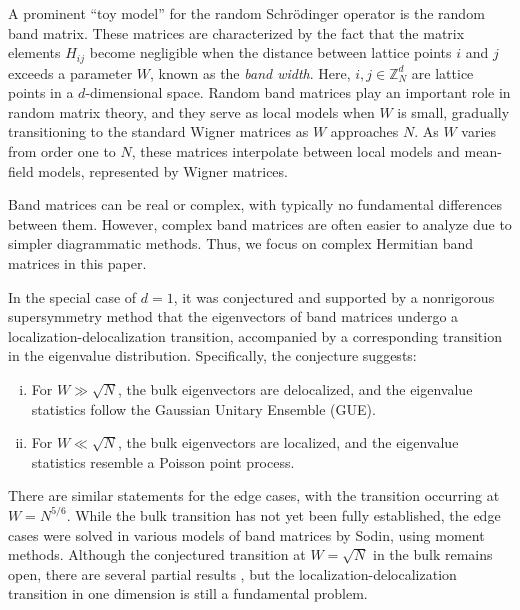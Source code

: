 \documentclass[10pt,reqno]{article}
\theoremstyle{plain} %
\theoremstyle{remark}
\numberwithin{equation}{section}
\begin{document}
A prominent “toy model” for the random Schrödinger operator is the random band matrix. These matrices are characterized by the fact that the matrix elements \( H_{ij} \) become negligible when the distance between lattice points \( i \) and \( j \) exceeds a parameter \( W \), known as the \textit{band width}. Here, \( i, j \in \mathbb{Z}_N^d \) are lattice points in a \( d \)-dimensional space. Random band matrices play an important role in random matrix theory, and they serve as local models when \( W \) is small, gradually transitioning to the standard Wigner matrices as \( W \) approaches \( N \). As \( W \) varies from order one to \( N \), these matrices interpolate between local models and mean-field models, represented by Wigner matrices.

Band matrices can be real or complex, with typically no fundamental differences between them. However, complex band matrices are often easier to analyze due to simpler diagrammatic methods. Thus, we focus on complex Hermitian band matrices in this paper.



In the special case of \( d = 1 \), it was conjectured \cite{PhysRevLett.64.1851, PhysRevLett.64.5, PhysRevLett.66.986} and supported by a nonrigorous supersymmetry method \cite{PhysRevLett.67.2405} that the eigenvectors of band matrices undergo a localization-delocalization transition, accompanied by a corresponding transition in the eigenvalue distribution.
 Specifically, the conjecture suggests:

\begin{enumerate}[(i)]
    \item For \( W \gg \sqrt{N} \), the bulk eigenvectors are delocalized, and the eigenvalue statistics follow the Gaussian Unitary Ensemble (GUE).
    \item For \( W \ll \sqrt{N} \), the bulk eigenvectors are localized, and the eigenvalue statistics resemble a Poisson point process.
\end{enumerate}

There are similar statements for the edge cases, with the transition occurring at \( W = N^{5/6} \). While the bulk transition has not yet been fully established, the edge cases were solved in various models of band matrices \cite{Sod2010} by Sodin, using moment methods. Although the conjectured transition at \( W = \sqrt{N} \) in the bulk remains open, there are several partial results \cite{BaoErd2015, https://doi.org/10.48550/arxiv.2206.05545, https://doi.org/10.48550/arxiv.2206.06439, erdHos2013local, EK_band1,ErdKno2011, HeMa2018,bourgade2017universality, bourgade2019random,bourgade2020random,yang2021random,Sch2009,PelSchShaSod,Sod2010,SchMT,Sch1,Sch2,Sch3,Sch2014}, but the localization-delocalization transition in one dimension is still a fundamental problem.
\end{document}
